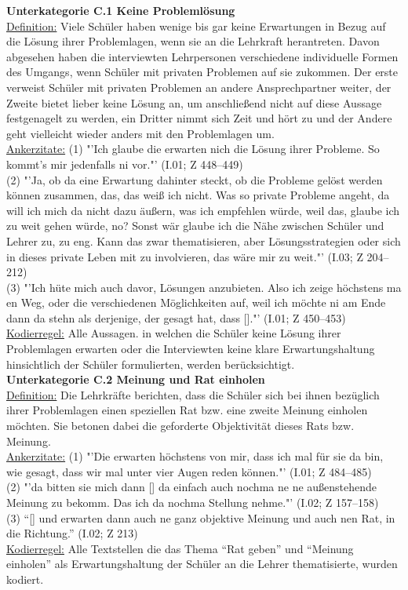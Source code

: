 \noindent
\textbf{Unterkategorie C.1 Keine Problemlösung}\\
\underline{Definition:} Viele Schüler haben wenige bis gar keine Erwartungen in Bezug auf die Lösung ihrer Problemlagen, wenn sie an die Lehrkraft herantreten. Davon abgesehen haben die interviewten Lehrpersonen verschiedene individuelle Formen des Umgangs, wenn Schüler mit privaten Problemen auf sie zukommen. Der erste verweist Schüler mit privaten Problemen an andere Ansprechpartner weiter, der Zweite bietet lieber keine Lösung an, um anschließend nicht auf diese Aussage festgenagelt zu werden, ein Dritter nimmt sich Zeit und hört zu und der Andere geht vielleicht wieder anders mit den Problemlagen um.\\
\underline{Ankerzitate:} (1) "'Ich glaube die erwarten nich die Lösung ihrer Probleme. So kommt's mir jedenfalls ni vor."' (I.01; Z 448--449)\\ (2) "'Ja, ob da eine Erwartung dahinter steckt, ob die Probleme gelöst werden können zusammen, das, das weiß ich nicht. Was so private Probleme angeht, da will ich mich da nicht dazu äußern, was ich empfehlen würde, weil das, glaube ich zu weit gehen würde, no? Sonst wär glaube ich die Nähe zwischen Schüler und Lehrer zu, zu eng. Kann das zwar thematisieren, aber Lösungsstrategien oder sich in dieses private Leben mit zu involvieren, das wäre mir zu weit."' (I.03; Z 204--212)\\ (3) "'Ich hüte mich auch davor, Lösungen anzubieten. Also ich zeige höchstens ma en Weg, oder die verschiedenen Möglichkeiten auf, weil ich möchte ni am Ende dann da stehn als derjenige, der gesagt hat, dass [\punkte]."' (I.01; Z 450--453)\\
\underline{Kodierregel:} Alle Aussagen. in welchen die Schüler keine Lösung ihrer Problemlagen erwarten oder die Interviewten keine klare Erwartungshaltung hinsichtlich der Schüler formulierten, werden berücksichtigt.\\

\noindent
\textbf{Unterkategorie C.2 Meinung und Rat einholen}\\
\underline{Definition:} Die Lehrkräfte berichten, dass die Schüler sich bei ihnen bezüglich ihrer Problemlagen einen speziellen Rat bzw. eine zweite Meinung einholen möchten. Sie betonen dabei die geforderte Objektivität dieses Rats bzw. Meinung.\\
\underline{Ankerzitate:} (1) "'Die erwarten höchstens von mir, dass ich mal für sie da bin, wie gesagt, dass wir mal unter vier Augen reden können."' (I.01; Z 484--485)\\ (2) "'da bitten sie mich dann [\punkte] da einfach auch nochma ne ne außenstehende Meinung zu bekomm. Das ich da nochma Stellung nehme."' (I.02; Z 157--158)\\ (3) "`[\punkte] und erwarten dann auch ne ganz objektive Meinung und auch nen Rat, in die Richtung."' (I.02; Z 213)\\
\underline{Kodierregel:} Alle Textstellen die das Thema "`Rat geben"' und "`Meinung einholen"' als Erwartungshaltung der Schüler an die Lehrer thematisierte, wurden kodiert. \\

